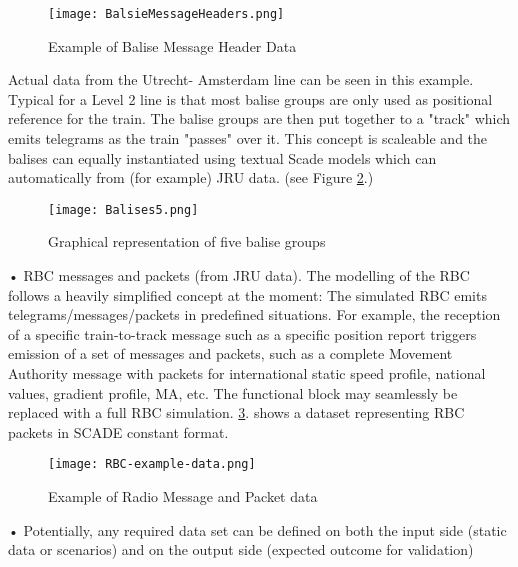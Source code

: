 \begin{figure}
  \centering
  \texttt{[image: BalsieMessageHeaders.png]}
  \caption{Example of Balise Message Header Data}
  \label{fig:BalsieMessageHeaders}
\end{figure}

Actual data from the Utrecht- Amsterdam line can be seen in this example. Typical for a Level 2 line is that most balise groups are only used as positional reference for the train.
The balise groups are then put together to a "track" which emits telegrams as the train "passes" over it.
This concept is scaleable and the balises can equally instantiated using textual Scade models which can automatically from (for example) JRU data.
(see Figure \ref{fig:Balises5}.)\\
	
\begin{figure}
  \centering
  \texttt{[image: Balises5.png]}
  \caption{Graphical representation of five balise groups}
  \label{fig:Balises5}
\end{figure}

•  	RBC messages and packets (from JRU data). The modelling of the RBC follows a heavily simplified concept at the moment: The simulated RBC emits telegrams/messages/packets in predefined situations. For example, the reception of a specific train-to-track message such as a specific position report triggers emission of a set of messages and packets, such as a complete Movement Authority message with packets for international static speed profile, national values, gradient profile, MA, etc.
The functional block may seamlessly be replaced with a full RBC simulation. \ref{fig:RBC-example-data}. shows a dataset representing RBC packets in SCADE constant format.

\begin{figure}
  \centering
  \texttt{[image: RBC-example-data.png]}
  \caption{Example of Radio Message and Packet data}
  \label{fig:RBC-example-data}
\end{figure}
•  	Potentially, any required data set can be defined on both the input side (static data or scenarios) and on the output side (expected outcome for validation)

%
%
%
%
